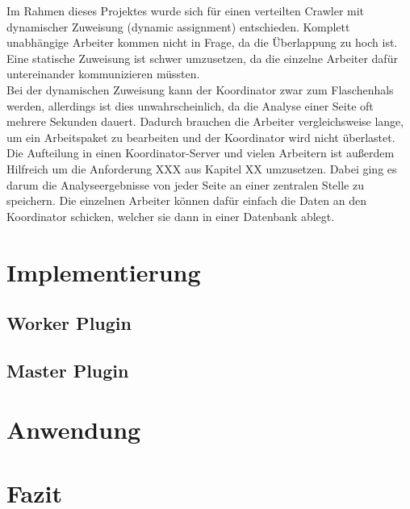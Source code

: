 Im Rahmen dieses Projektes wurde sich für einen verteilten Crawler mit dynamischer Zuweisung (dynamic assignment) entschieden. Komplett unabhängige Arbeiter kommen nicht in Frage, da die Überlappung zu hoch ist. Eine statische Zuweisung ist schwer umzusetzen, da die einzelne Arbeiter dafür untereinander kommunizieren müssten. \\
Bei der dynamischen Zuweisung kann der Koordinator zwar zum Flaschenhals werden, allerdings ist dies unwahrscheinlich, da die Analyse einer Seite oft mehrere Sekunden dauert. Dadurch brauchen die Arbeiter vergleichsweise lange, um ein Arbeitspaket zu bearbeiten und der Koordinator wird nicht überlastet. \\
Die Aufteilung in einen Koordinator-Server und vielen Arbeitern ist außerdem Hilfreich um die Anforderung XXX aus Kapitel XX umzusetzen. Dabei ging es darum die Analyseergebnisse von jeder Seite an einer zentralen Stelle zu speichern. Die einzelnen Arbeiter können dafür einfach die Daten an den Koordinator schicken, welcher sie dann in einer Datenbank ablegt.







\chapter{Implementierung}
\section{Worker Plugin}
\section{Master Plugin}
\chapter{Anwendung}
\chapter{Fazit}

